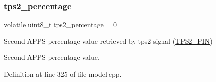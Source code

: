 \mbox{\label{group___board__model__group_gaf69d82f83885abc5adbd5fcbf4c421cf}} 
\subsubsection{\texorpdfstring{tps2\+\_\+percentage}{tps2\_percentage}\hspace{0.1cm}{\footnotesize\ttfamily [2/2]}}
{\footnotesize\ttfamily volatile uint8\+\_\+t tps2\+\_\+percentage = 0}



Second A\+P\+PS percentage value retrieved by tps2 signal (\mbox{\hyperlink{group___board__pinout__group_gab13a816bae3ca994897fc6f1cb590a67}{T\+P\+S2\+\_\+\+P\+IN}}) 

Second A\+P\+PS percentage value. 

Definition at line 325 of file model.\+cpp.

